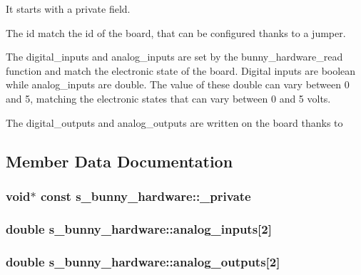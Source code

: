 It starts with a private field.

The id match the id of the board, that can be configured thanks to a jumper.

The digital\-\_\-inputs and analog\-\_\-inputs are set by the bunny\-\_\-hardware\-\_\-read function and match the electronic state of the board. Digital inputs are boolean while analog\-\_\-inputs are double. The value of these double can vary between 0 and 5, matching the electronic states that can vary between 0 and 5 volts.

The digital\-\_\-outputs and analog\-\_\-outputs are written on the board thanks to 

\subsection{Member Data Documentation}
\hypertarget{structs__bunny__hardware_add026ee96be41faf560395aa39d3fe25}{
\subsubsection[{\-\_\-private}]{ void$\ast$ {\bf const} s\-\_\-bunny\-\_\-hardware\-::\-\_\-private}}\label{structs__bunny__hardware_add026ee96be41faf560395aa39d3fe25}
\hypertarget{structs__bunny__hardware_a19dd432d40c86ff1cb5931b0d5c344c6}{
\subsubsection[{analog\-\_\-inputs}]{ double s\-\_\-bunny\-\_\-hardware\-::analog\-\_\-inputs\mbox{[}2\mbox{]}}}\label{structs__bunny__hardware_a19dd432d40c86ff1cb5931b0d5c344c6}
\hypertarget{structs__bunny__hardware_a333c865cf78646f7ed3c25d99f85840c}{
\subsubsection[{analog\-\_\-outputs}]{\setlength{\rightskip}{0pt plus 5cm}double s\-\_\-bunny\-\_\-hardware\-::analog\-\_\-outputs\mbox{[}2\mbox{]}}}\label{structs__bunny__hardware_a333c865cf78646f7ed3c25d99f85840c}
